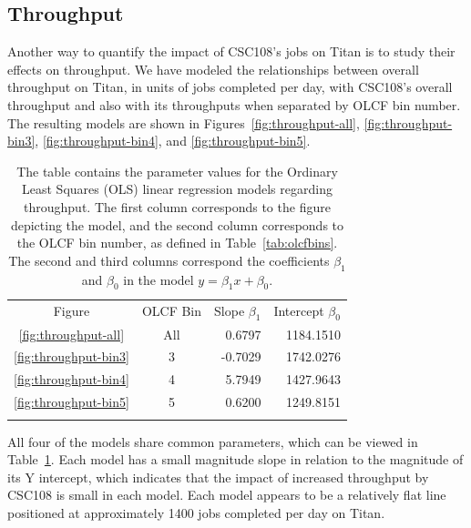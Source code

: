 \subsection{Throughput}
\label{subsec:throughput}

Another way to quantify the impact of CSC108's jobs on Titan is to study their
effects on throughput. We have modeled the relationships between overall
throughput on Titan, in units of jobs completed per day, with CSC108's overall
throughput and also with its throughputs when separated by OLCF bin number. The
resulting models are shown in Figures~\ref{fig:throughput-all},
\ref{fig:throughput-bin3}, \ref{fig:throughput-bin4}, and
\ref{fig:throughput-bin5}.

\begin{table}
\caption{The table contains the parameter values for the Ordinary Least Squares
(OLS) linear regression models regarding throughput. The first column 
corresponds to the figure depicting the model, and the second column
corresponds to the OLCF bin number, as defined in Table~\ref{tab:olcfbins}. The
second and third columns correspond the coefficients $\beta_1$ and $\beta_0$ in
the model $y = \beta_{1}x + \beta_0$.}
\label{tab:throughput-params}       %
\begin{tabular}{ccrr}
\hline\noalign{\smallskip}
Figure & OLCF Bin & Slope $\beta_1$  & Intercept $\beta_0$  \\
\noalign{\smallskip}\hline\noalign{\smallskip}
\ref{fig:throughput-all}    &   All &   0.6797  &   1184.1510   \\
\ref{fig:throughput-bin3}   &   3   &  -0.7029  &   1742.0276   \\
\ref{fig:throughput-bin4}   &   4   &   5.7949  &   1427.9643   \\
\ref{fig:throughput-bin5}   &   5   &   0.6200  &   1249.8151   \\
\noalign{\smallskip}\hline
\end{tabular}
\end{table}

All four of the models share common parameters, which can be viewed in
Table~\ref{tab:throughput-params}. Each model has a small magnitude slope in
relation to the magnitude of its Y intercept, which indicates that the impact
of increased throughput by CSC108 is small in each model. Each model appears to
be a relatively flat line positioned at approximately 1400 jobs completed per
day on Titan.

